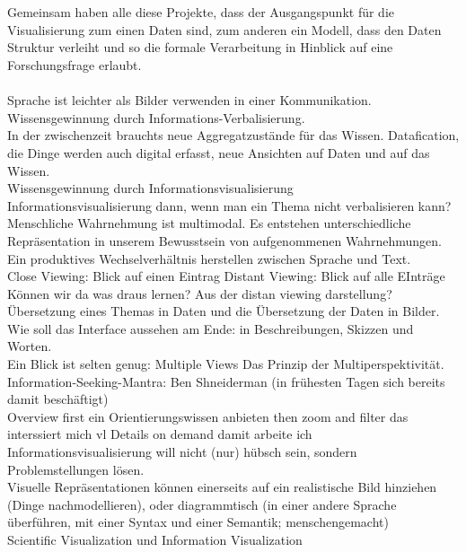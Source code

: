 \documentclass[12pt,a4paper]{article}
\begin{document}
\\
\\
Gemeinsam haben alle diese Projekte, dass der Ausgangspunkt für die Visualisierung zum einen Daten sind, zum anderen ein Modell, dass den Daten Struktur verleiht und so die formale Verarbeitung in Hinblick auf eine Forschungsfrage erlaubt.
\\ 
\\
Sprache ist leichter als Bilder verwenden in einer Kommunikation.
\\
Wissensgewinnung durch Informations-Verbalisierung. 
\\
In der zwischenzeit brauchts neue Aggregatzustände für das Wissen. 
Datafication, die Dinge werden auch digital erfasst, neue Ansichten auf Daten und auf das Wissen.
\\
Wissensgewinnung durch Informationsvisualisierung
\\
Informationsvisualisierung dann, wenn man ein Thema nicht verbalisieren kann?
\\
Menschliche Wahrnehmung ist multimodal. Es entstehen unterschiedliche Repräsentation in unserem Bewusstsein von aufgenommenen Wahrnehmungen. Ein produktives Wechselverhältnis herstellen zwischen Sprache und Text.
\\
Close Viewing: Blick auf einen Eintrag
Distant Viewing: Blick auf alle EInträge
\\
Können wir da was draus lernen? Aus der distan viewing darstellung?
\\
Übersetzung eines Themas in Daten und die Übersetzung der Daten in Bilder.
Wie soll das Interface aussehen am Ende: in Beschreibungen, Skizzen und Worten.
\\
Ein Blick ist selten genug: Multiple Views
Das Prinzip der Multiperspektivität.
\\
Information-Seeking-Mantra: Ben Shneiderman (in frühesten Tagen sich bereits damit beschäftigt)
\\
Overview first            ein Orientierungswissen anbieten
 then zoom and filter        das interssiert mich vl
Details on demand        damit arbeite ich
\\
Informationsvisualisierung will nicht (nur) hübsch sein, sondern Problemstellungen lösen.
\\
Visuelle Repräsentationen können einerseits auf ein realistische Bild hinziehen (Dinge nachmodellieren), oder diagrammtisch (in einer andere Sprache überführen, mit einer Syntax und einer Semantik; menschengemacht)
\\ 
Scientific Visualization und Information Visualization
\end{document}
